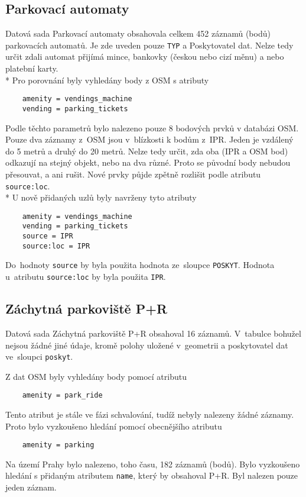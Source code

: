 \subsection{Parkovací automaty}
\label{Parkovací automaty}
Datová sada Parkovací automaty obsahovala celkem 452 záznamů (bodů)
parkovacích automatů. Je zde uveden pouze {\tt TYP} a Poskytovatel dat.
Nelze tedy určit zdali automat přijímá mince, bankovky (českou nebo
cizí měnu) a nebo platební karty.
\\*
Pro porovnání byly vyhledány body z OSM s atributy
\begin{verbatim}
    amenity = vendings_machine
    vending = parking_tickets
\end{verbatim}
Podle těchto parametrů bylo nalezeno pouze 8 bodových prvků v databázi
OSM. Pouze dva záznamy z~OSM jsou v~blízkosti k bodům z~IPR. Jeden je
vzdálený do 5 metrů a druhý do 20 metrů. Nelze tedy určit, zda oba (IPR
a OSM bod) odkazují na stejný objekt, nebo na dva různé. Proto se
původní body nebudou přesouvat, a ani rušit. Nové prvky půjde zpětně
rozlišit podle atributu {\tt source:loc}.
\\*
U nově přidaných uzlů byly navrženy tyto atributy
\begin{verbatim}
    amenity = vendings_machine
    vending = parking_tickets
    source = IPR
    source:loc = IPR
\end{verbatim}
Do~hodnoty {\tt source} by byla použita hodnota ze~sloupce
{\tt POSKYT}. Hodnota u~atributu {\tt source:loc} by byla použita
{\tt IPR}.

\subsection{Záchytná parkoviště P+R}
\label{Záchytná parkoviště P+R}
Datová sada Záchytná parkoviště P+R obsahoval 16 záznamů. V~tabulce
bohužel nejsou žádné jiné údaje, kromě polohy uložené v~geometrii a
poskytovatel dat ve~sloupci {\tt poskyt}.

Z dat OSM byly vyhledány body pomocí atributu
\begin{verbatim}
    amenity = park_ride
\end{verbatim}
Tento atribut je stále ve fázi schvalování, tudíž nebyly nalezeny
žádné záznamy. 
Proto bylo vyzkoušeno hledání pomocí obecnějšího atributu
\begin{verbatim}
    amenity = parking
\end{verbatim}
Na území Prahy bylo nalezeno, toho času, 182 záznamů (bodů). Bylo
vyzkoušeno hledání s přidaným atributem {\tt name}, který by
obsahoval P+R. Byl nalezen pouze jeden záznam.

